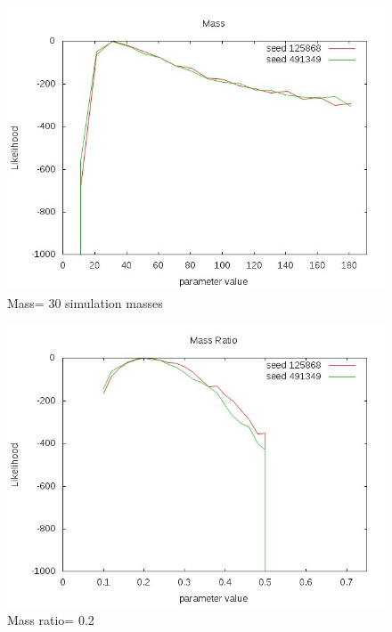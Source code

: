 \documentclass[12pt]{article}
\begin{document}
\begin{figure}[h!]
\centering
\includegraphics[width=20cm]{./plots/mass.jpeg}
\caption{Mass= 30 simulation masses}
\end{figure}

\begin{figure}[h!]
\centering
\includegraphics[width=20cm]{./plots/massratio.jpeg}
\caption{Mass ratio= 0.2}
\end{figure}
\end{document}
